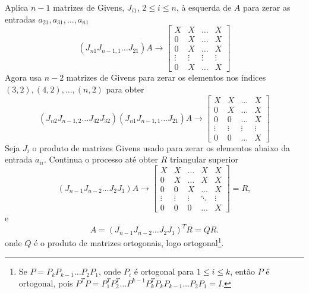 \documentclass{article}
\begin{document}
\begin{tcolorbox}[title=Algoritmo da decomposição QR de Givens]
    Aplica \(n-1\) matrizes de Givens, \(J_{i1}\), \(2 \leq i \leq n\), à esquerda de \(A\) para zerar as entradas \(a_{21}, a_{31}, \ldots, a_{n1}\)
    \[
        (J_{n1}J_{n-1,1}\ldots J_{21})A \to \begin{bmatrix}
            X & X & \ldots & X \\
            0 & X & \ldots & X \\
            0 & X & \ldots & X \\
            \vdots & \vdots & \vdots & \vdots \\
            0 & X & \ldots & X
        \end{bmatrix}
    \]
    Agora usa \(n-2\) matrizes de Givens para zerar os elementos nos índices \((3,2), (4,2), \ldots, (n,2)\) para obter
    \[
        (J_{n2}J_{n-1,2}\ldots J_{42}J_{32})(J_{n1}J_{n-1,1}\ldots J_{21})A \to \begin{bmatrix}
            X & X & \ldots & X \\
            0 & X & \ldots & X \\
            0 & 0 & \ldots & X \\
            \vdots & \vdots & \vdots & \vdots \\
            0 & 0 & \ldots & X
        \end{bmatrix}
    \]
    Seja \(J_i\) o produto de matrizes Givens usado para zerar os elementos abaixo da entrada \(a_{ii}\). Continua o processo até obter \(R\) triangular superior
    \[
        (J_{n-1}J_{n-2}\ldots J_2 J_1)A \to \begin{bmatrix}
            X & X & \ldots & X & X \\
            0 & X & \ldots & X & X \\
            0 & 0 & X & \ldots & X \\
            \vdots & \vdots & \vdots & \ddots & \vdots \\
            0 & 0 & 0 & \ldots & X
        \end{bmatrix} = R,
    \]
    e 
    \[
        A = (J_{n-1}J_{n-2}\ldots J_2 J_1)^{T}R = Q R.
    \]
    onde \(Q\) é o produto de matrizes ortogonais, logo ortogonal\footnote{Se \(P=P_k P_{k-1}\ldots P_2 P_1\), onde \(P_i\) é ortogonal para \(1 \leq i \leq k\), então \(P\) é ortogonal, pois \(P^T P = P_1^T P_2^T \ldots P^{k-1} P_k^T P_k P_{k-1} \ldots P_2 P_1 = I\).}.
\end{tcolorbox}
\end{document}

